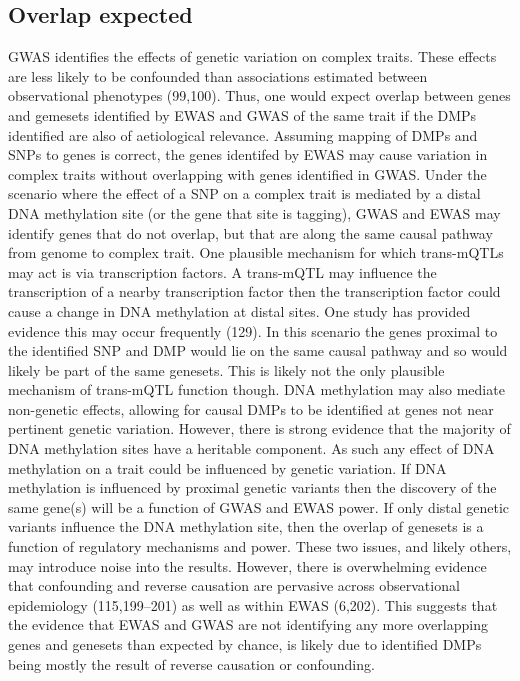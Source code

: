 \documentclass[11pt,oneside]{bristolthesis}
\begin{document}
\hypertarget{overlap-expected}{%
\subsection{Overlap expected}\label{overlap-expected}}

GWAS identifies the effects of genetic variation on complex traits. These effects are less likely to be confounded than associations estimated between observational phenotypes (99,100). Thus, one would expect overlap between genes and gemesets identified by EWAS and GWAS of the same trait if the DMPs identified are also of aetiological relevance. Assuming mapping of DMPs and SNPs to genes is correct, the genes identifed by EWAS may cause variation in complex traits without overlapping with genes identified in GWAS. Under the scenario where the effect of a SNP on a complex trait is mediated by a distal DNA methylation site (or the gene that site is tagging), GWAS and EWAS may identify genes that do not overlap, but that are along the same causal pathway from genome to complex trait. One plausible mechanism for which trans-mQTLs may act is via transcription factors. A trans-mQTL may influence the transcription of a nearby transcription factor then the transcription factor could cause a change in DNA methylation at distal sites. One study has provided evidence this may occur frequently (129). In this scenario the genes proximal to the identified SNP and DMP would lie on the same causal pathway and so would likely be part of the same genesets. This is likely not the only plausible mechanism of trans-mQTL function though. DNA methylation may also mediate non-genetic effects, allowing for causal DMPs to be identified at genes not near pertinent genetic variation. However, there is strong evidence that the majority of DNA methylation sites have a heritable component. As such any effect of DNA methylation on a trait could be influenced by genetic variation. If DNA methylation is influenced by proximal genetic variants then the discovery of the same gene(s) will be a function of GWAS and EWAS power. If only distal genetic variants influence the DNA methylation site, then the overlap of genesets is a function of regulatory mechanisms and power. These two issues, and likely others, may introduce noise into the results. However, there is overwhelming evidence that confounding and reverse causation are pervasive across observational epidemiology (115,199--201) as well as within EWAS (6,202). This suggests that the evidence that EWAS and GWAS are not identifying any more overlapping genes and genesets than expected by chance, is likely due to identified DMPs being mostly the result of reverse causation or confounding.
\end{document}
